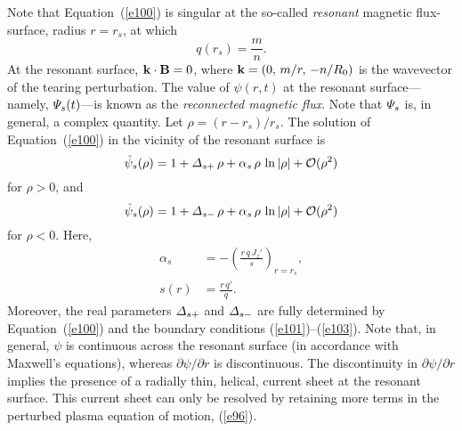 \documentclass[notitlepage,12pt]{article}
\begin{document}
Note that Equation~(\ref{e100}) is singular at the so-called {\em resonant}\/ magnetic flux-surface, radius $r=r_s$, at which 
\begin{equation}\label{e104}
q(r_s)= \frac{m}{n}.
\end{equation}
At the resonant surface, ${\bf k}\cdot{\bf B}=0$, where ${\bf k} = (0,\,m/r,\,-n/R_0)$ is the wavevector of the tearing perturbation. 
The value of $\psi(r,t)$ at the resonant surface---namely, ${\mit\Psi}_s(t)$---is known as the {\em reconnected magnetic flux}. 
Note that ${\mit\Psi}_s$ is, in general, a complex quantity. 
Let $\rho=(r-r_s)/r_s$. 
The solution of Equation~(\ref{e100}) in the vicinity of the resonant surface is
\begin{equation}\label{e105}
\hat{\psi}_s(\rho) = 1 + {\mit\Delta}_{s+}\,\rho + \alpha_s\,\rho\,\ln|\rho| + {\cal O}(\rho^2)
\end{equation}
for $\rho>0$, and
\begin{equation}\label{e106}
\hat{\psi}_s(\rho) = 1 + {\mit\Delta}_{s-}\,\rho + \alpha_s\,\rho\,\ln|\rho| + {\cal O}(\rho^2)
\end{equation}
for $\rho<0$. Here, 
\begin{align}
\alpha_s& =- \left(\frac{r\,q\,J_z'}{s}\right)_{r=r_s},\\[0.5ex]
s(r) &= \frac{r\,q'}{q}.
\end{align}
Moreover,  the real parameters ${\mit\Delta}_{s+}$ and  ${\mit\Delta}_{s-}$ are fully determined by Equation~(\ref{e100})
and the boundary conditions (\ref{e101})--(\ref{e103}). Note that, in general, $\psi$ is continuous across the resonant surface (in accordance with Maxwell's equations),
whereas $\partial\psi/\partial r$ is discontinuous. The discontinuity in $\partial \psi/\partial r$ implies the presence of a radially
thin, helical,  current sheet  at the resonant surface. This current sheet can only be resolved by retaining more terms in the perturbed plasma equation of motion, (\ref{e96}). 
\end{document}
